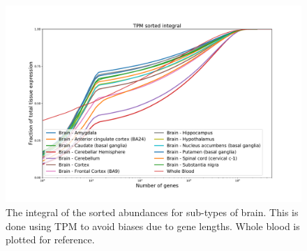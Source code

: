 \begin{figure}[htb!]
  \centering
  \includegraphics[width=0.85\linewidth]{pictures/structure/gtex/fraction_of_trascriptome_Brain.pdf}
  \caption{The integral of the sorted abundances for sub-types of brain. This is done using TPM to avoid biases due to gene lengths. Whole blood is plotted for reference.}
  \label{fig:structure/gtex/fraction_of_trascriptome_Brain}
\end{figure}

